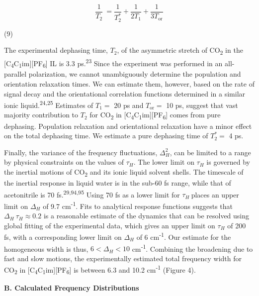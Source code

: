 \documentclass[]{article}
\begin{document}
\[\frac{1}{T_{2}}\  = \frac{1}{T_{2}^{*}} + \frac{1}{2T_{1}} + \frac{1}{3T_{\text{or}}}\]

(9)

The experimental dephasing time, \(T_{2}\), of the asymmetric stretch of CO\textsubscript{2} in the {[}C\textsubscript{4}C\textsubscript{1}im{]}{[}PF\textsubscript{6}{]} IL is 3.3 ps.\textsuperscript{23} Since the experiment was performed in an all-parallel polarization, we cannot unambiguously determine the population and orientation relaxation times. We can estimate them, however, based on the rate of signal decay and the orientational correlation functions determined in a similar ionic liquid.\textsuperscript{24,25} Estimates of \(T_{1} =\) 20 ps and \(T_{\mathrm{\text{or}}} =\) 10 ps, suggest that vast majority contribution to \(T_{2}\) for CO\textsubscript{2} in {[}C\textsubscript{4}C\textsubscript{1}im{]}{[}PF\textsubscript{6}{]} comes from pure dephasing. Population relaxation and orientational relaxation have a minor effect on the total dephasing time. We estimate a pure dephasing time of \(T_{2}^{*} =\) 4 ps.

Finally, the variance of the frequency fluctuations, \(\Delta_{H}^{2}\), can be limited to a range by physical constraints on the values of \(\tau_{H}\). The lower limit on \(\tau_{H}\) is governed by the inertial motions of CO\textsubscript{2} and its ionic liquid solvent shells. The timescale of the inertial response in liquid water is in the sub-60 fs range, while that of acetonitrile is 70 fs.\textsuperscript{29,94,95} Using 70 fs as a lower limit for \(\tau_{H}\ \)places an upper limit on \(\Delta_{H}\) of 9.7 cm\textsuperscript{-1}. Fits to analytical response functions suggests that \(\Delta_{H}\ \tau_{H} \approx 0.2\) is a reasonable estimate of the dynamics that can be resolved using global fitting of the experimental data, which gives an upper limit on \(\tau_{H}\) of 200 fs, with a corresponding lower limit on \(\Delta_{H}\) of 6 cm\textsuperscript{-1}. Our estimate for the homogeneous width is thus, \(6 < \Delta_{H} < 10\) cm\textsuperscript{‑1}. Combining the broadening due to fast and slow motions, the experimentally estimated total frequency width for CO\textsubscript{2} in {[}C\textsubscript{4}C\textsubscript{1}im{]}{[}PF\textsubscript{6}{]} is between 6.3 and 10.2 cm\textsuperscript{-1} (Figure 4).

\textbf{B. Calculated Frequency Distributions}
\end{document}
